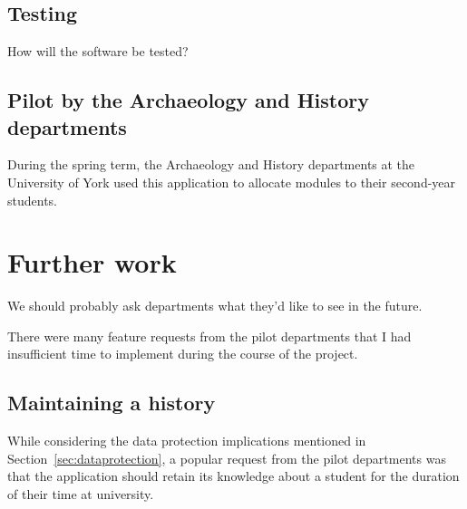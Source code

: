 \documentclass[]{scrartcl}
\begin{document}


\subsection{Testing}

How will the software be tested?

\subsection{Pilot by the Archaeology and History departments}

During the spring term, the Archaeology and History departments at the
University of York used this application to allocate modules to their
second-year students.

% 

\section{Further work}
\label{sec:furtherwork}


We should probably ask departments what they'd like to see in the future.

There were many feature requests from the pilot departments that I had
insufficient time to implement during the course of the project.

\subsection{Maintaining a history}

While considering the data protection implications mentioned in
Section~\ref{sec:dataprotection}, a popular request from the pilot departments
was that the application should retain its knowledge about a student for the
duration of their time at university.
\end{document}
